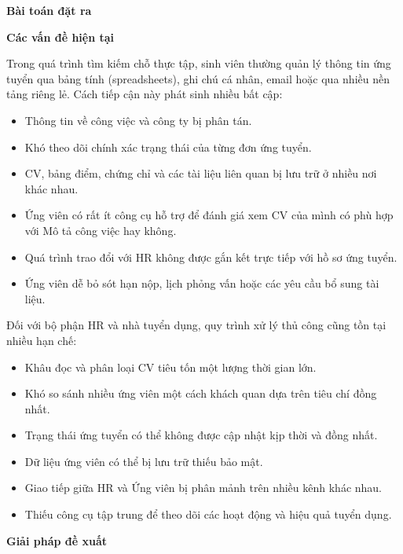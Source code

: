\vspace{0.5em}\noindent\textbf{Bài toán đặt ra}\par

\vspace{0.5em}\noindent\textbf{Các vấn đề hiện
tại}\par

Trong quá trình tìm kiếm chỗ thực tập, sinh viên thường quản lý thông
tin ứng tuyển qua bảng tính (spreadsheets), ghi chú cá nhân, email hoặc
qua nhiều nền tảng riêng lẻ. Cách tiếp cận này phát sinh nhiều bất cập:

\begin{itemize}
\tightlist
\item
  Thông tin về công việc và công ty bị phân tán.
\item
  Khó theo dõi chính xác trạng thái của từng đơn ứng tuyển.
\item
  CV, bảng điểm, chứng chỉ và các tài liệu liên quan bị lưu trữ ở nhiều
  nơi khác nhau.
\item
  Ứng viên có rất ít công cụ hỗ trợ để đánh giá xem CV của mình có phù
  hợp với Mô tả công việc hay không.
\item
  Quá trình trao đổi với HR không được gắn kết trực tiếp với hồ sơ ứng
  tuyển.
\item
  Ứng viên dễ bỏ sót hạn nộp, lịch phỏng vấn hoặc các yêu cầu bổ sung
  tài liệu.
\end{itemize}

Đối với bộ phận HR và nhà tuyển dụng, quy trình xử lý thủ công cũng tồn
tại nhiều hạn chế:

\begin{itemize}
\tightlist
\item
  Khâu đọc và phân loại CV tiêu tốn một lượng thời gian lớn.
\item
  Khó so sánh nhiều ứng viên một cách khách quan dựa trên tiêu chí đồng
  nhất.
\item
  Trạng thái ứng tuyển có thể không được cập nhật kịp thời và đồng nhất.
\item
  Dữ liệu ứng viên có thể bị lưu trữ thiếu bảo mật.
\item
  Giao tiếp giữa HR và Ứng viên bị phân mảnh trên nhiều kênh khác nhau.
\item
  Thiếu công cụ tập trung để theo dõi các hoạt động và hiệu quả tuyển
  dụng.
\end{itemize}

\vspace{0.5em}\noindent\textbf{Giải pháp đề
xuất}\par


